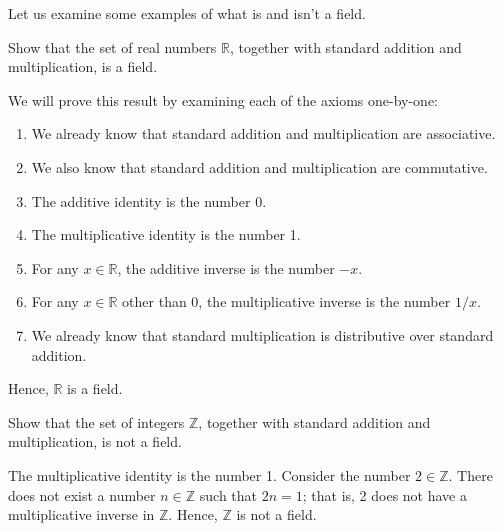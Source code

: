 Let us examine some examples of what is and isn't a field.

\begin{exmp}
Show that the set of real numbers $ \mathbb{R} $, together with standard addition and multiplication, is a field.
\end{exmp}
\begin{sltn}
We will prove this result by examining each of the axioms one-by-one:
\begin{enumerate}
    \item We already know that standard addition and multiplication are associative.

    \item We also know that standard addition and multiplication are commutative.

    \item The additive identity is the number 0.
    
    \item The multiplicative identity is the number 1.
    
    \item For any $ x\in\mathbb{R} $, the additive inverse is the number $ -x $.
    
    \item For any $ x\in\mathbb{R} $ other than 0, the multiplicative inverse is the number $ 1/x $.
    
    \item We already know that standard multiplication is distributive over standard addition.
\end{enumerate}
Hence, $ \mathbb{R} $ is a field.
\end{sltn}

\begin{exmp}
Show that the set of integers $ \mathbb{Z} $, together with standard addition and multiplication, is not a field.
\end{exmp}
\begin{sltn}
The multiplicative identity is the number 1. Consider the number $ 2\in\mathbb{Z} $. There does not exist a number $ n\in\mathbb{Z} $ such that $ 2n=1 $; that is, 2 does not have a multiplicative inverse in $ \mathbb{Z} $. Hence, $ \mathbb{Z} $ is not a field.
\end{sltn}

